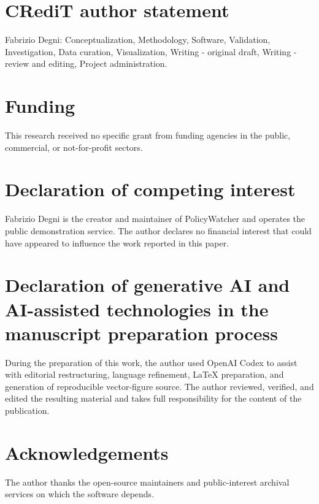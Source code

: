 \documentclass[preprint,12pt,a4paper]{elsarticle}
\begin{document}
\section*{CRediT author statement}

Fabrizio Degni: Conceptualization, Methodology, Software, Validation,
Investigation, Data curation, Visualization, Writing - original draft, Writing -
review and editing, Project administration.

\section*{Funding}

This research received no specific grant from funding agencies in the public,
commercial, or not-for-profit sectors.

\section*{Declaration of competing interest}

Fabrizio Degni is the creator and maintainer of PolicyWatcher and operates the
public demonstration service. The author declares no financial interest that
could have appeared to influence the work reported in this paper.

\section*{Declaration of generative AI and AI-assisted technologies in the manuscript preparation process}

During the preparation of this work, the author used OpenAI Codex to assist with
editorial restructuring, language refinement, LaTeX preparation, and generation
of reproducible vector-figure source. The author reviewed, verified, and edited
the resulting material and takes full responsibility for the content of the
publication.

\section*{Acknowledgements}

The author thanks the open-source maintainers and public-interest archival
services on which the software depends.
\end{document}

